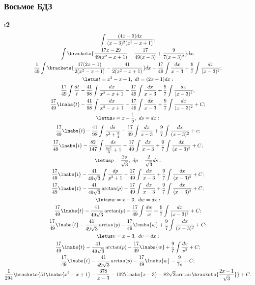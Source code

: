 \subsubsection{Восьмое БДЗ}

\setcounter{iii}{10}

\i \textbf{2}\\
\pu
\begin{gather*}
    \int\frac{(4x-3)dx}{(x-3)^2(x^2-x+1)};\\
    \int\brackets{\frac{17x-29}{49(x^2-x+1)}-\frac{17}{49(x-3)}+\frac{9}{7(x-3)^2}}dx;\\
    \frac{1}{49}\int\brackets{\frac{17(2x-1)}{2(x^2-x+1)}-\frac{41}{2(x^2-x+1)}}dx - \frac{17}{49}\int\frac{dx}{x-3} + \frac{9}{7}\int\frac{dx}{(x-3)^2};\\
    \letus t = x^2-x+1,\ dt = (2x-1)dx:\\
    \frac{17}{49}\int\frac{dt}{t} - \frac{41}{98}\int\frac{dx}{x^2-x+1} - \frac{17}{49}\int\frac{dx}{x-3} + \frac{9}{7}\int\frac{dx}{(x-3)^2};\\
    \frac{17}{49}\lnabs{t} - \frac{41}{98}\int\frac{dx}{x^2-x+1} - \frac{17}{49}\int\frac{dx}{x-3} + \frac{9}{7}\int\frac{dx}{(x-3)^2} + C;\\
    \letus s = x-\frac{1}{2},\ ds = dx:\\
    \frac{17}{49}\lnabs{t} - \frac{41}{98}\int\frac{ds}{s^2 + \frac{3}{4}} - \frac{17}{49}\int\frac{dx}{x-3} + \frac{9}{7}\int\frac{dx}{(x-3)^2} + c;\\
    \frac{17}{49}\lnabs{t} - \frac{82}{147}\int\frac{ds}{\frac{4s^2}{3}+1} - \frac{17}{49}\int\frac{dx}{x-3} + \frac{9}{7}\int\frac{dx}{(x-3)^2} + C;\\
    \letus p = \frac{2s}{\sqrt{3}},\ dp = \frac{2}{\sqrt{3}}ds:\\
    \frac{17}{49}\lnabs{t} - \frac{41}{49\sqrt{3}}\int\frac{dp}{p^2+1} - \frac{17}{49}\int\frac{dx}{x-3} + \frac{9}{7}\int\frac{dx}{(x-3)^2} + C;\\
    \frac{17}{49}\lnabs{t} - \frac{41}{49\sqrt{3}}\arctan(p) - \frac{17}{49}\int\frac{dx}{x-3} + \frac{9}{7}\int\frac{dx}{(x-3)^2} + C;\\
    \letus w = x-3,\ dw = dx:\\
    \frac{17}{49}\lnabs{t} - \frac{41}{49\sqrt{3}}\arctan(p) - \frac{17}{49}\int\frac{dw}{w} + \frac{9}{7}\int\frac{dx}{(x-3)^2} + C;\\
    \frac{17}{49}\lnabs{t} - \frac{41}{49\sqrt{3}}\arctan(p) - \frac{17}{49}\lnabs{w} + \frac{9}{7}\int\frac{dx}{(x-3)^2} + C;\\
    \letus v = x-3,\ dv = dx:\\
    \frac{17}{49}\lnabs{t} - \frac{41}{49\sqrt{3}}\arctan(p) - \frac{17}{49}\lnabs{w} + \frac{9}{7}\int\frac{dv}{v^2} + C;\\
    \frac{17}{49}\lnabs{t} - \frac{41}{49\sqrt{3}}\arctan(p) - \frac{17}{49}\lnabs{w} - \frac{9}{7v} + C;\\
    \frac{1}{294}\brackets{51\lnabs{x^2-x+1} - \frac{378}{x-3} - 102\lnabs{x-3} - 82\sqrt{3}\arctan\brackets{\frac{2x-1}{\sqrt{3}}}} + C.
\end{gather*}
